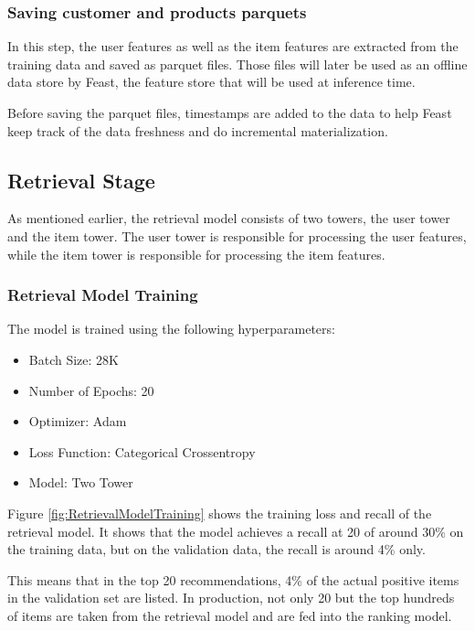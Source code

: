 \subsubsection{Saving customer and products parquets}

In this step, the user features as well as the item features are extracted from the training data and saved as parquet files.
Those files will later be used as an offline data store by Feast, the feature store that will be used at inference time.

Before saving the parquet files, timestamps are added to the data to help Feast keep track of the data freshness and do incremental materialization.

\subsection{Retrieval Stage}

As mentioned earlier, the retrieval model consists of two towers, the user tower and the item tower. 
The user tower is responsible for processing the user features, while the item tower is responsible for processing the item features.

\subsubsection{Retrieval Model Training}

The model is trained using the following hyperparameters:

\begin{itemize}
\item Batch Size: 28K
\item Number of Epochs: 20
\item Optimizer: Adam
\item Loss Function: Categorical Crossentropy
\item Model: Two Tower 
\end{itemize}

Figure \ref{fig:RetrievalModelTraining} shows the training loss and recall of the retrieval model.
It shows that the model achieves a recall at 20 of around 30\% on the training data, but on the validation data, the recall is around 4\% only.

This means that in the top 20 recommendations, 4\% of the actual positive items in the validation set are listed.
In production, not only 20 but the top hundreds of items are taken from the retrieval model and are fed into the ranking model. 

